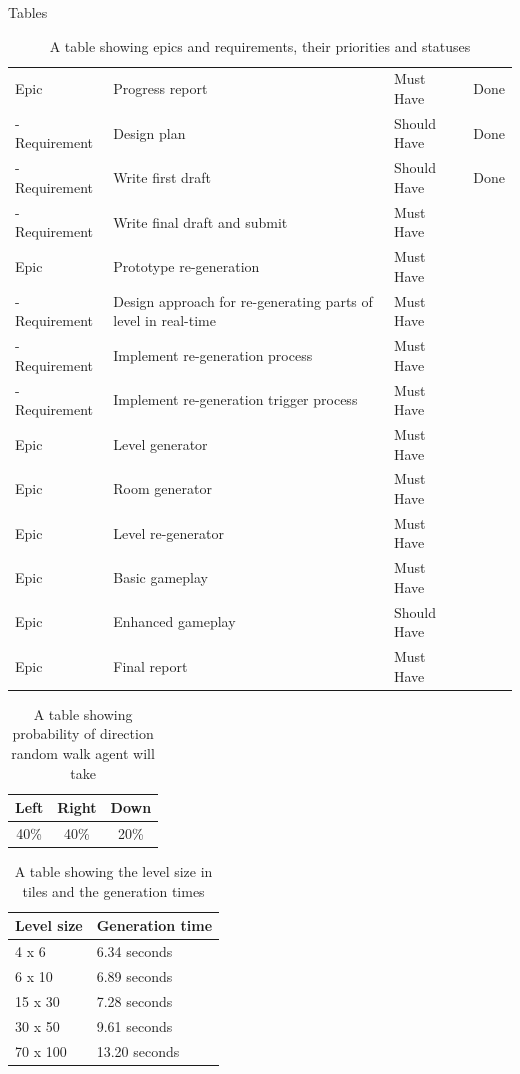 \documentclass[progress]{cmpreport}
\begin{document}
\begin{section}{Tables}
\begin{table}[]
{\begin{tabular}{llll}
    Epic & Progress report & Must Have & Done \\
    - Requirement & Design plan & Should Have & Done \\
    - Requirement & Write first draft & Should Have & Done \\
    - Requirement & Write final draft and submit & Must Have &  \\ \hline
    Epic & Prototype re-generation & Must Have &  \\
    - Requirement & Design approach for re-generating parts of level in real-time & Must Have &  \\
    - Requirement & Implement re-generation process & Must Have &  \\
    - Requirement & Implement re-generation trigger process & Must Have &  \\ \hline
    Epic & Level generator & Must Have &  \\ \hline
    Epic & Room generator & Must Have &  \\ \hline
    Epic & Level re-generator & Must Have &  \\ \hline
    Epic & Basic gameplay & Must Have &  \\ \hline
    Epic & Enhanced gameplay & Should Have &  \\ \hline
    Epic & Final report & Must Have &  \\ \hline
    \end{tabular}%
    }
    \caption{A table showing epics and requirements, their priorities and statuses}
    \label{tab:epicreqs}
\end{table}

\begin{table}[h!]
    \centering
    \begin{tabular}{ |c|c|c| }
    \hline
    \textbf{Left} & \textbf{Right} & \textbf{Down} \\ 
    \hline
    40\% & 40\% & 20\%\\ 
    \hline
    \end{tabular}
    \caption{A table showing probability of direction random walk agent will take}
    \label{tab:probdirs}
\end{table}

\begin{table}[]
    \centering
    \begin{tabular}{|l|l|}
    \hline
    \textbf{Level size} & \textbf{Generation time} \\ \hline
    4 x 6 & 6.34 seconds \\ \hline
    6 x 10 & 6.89 seconds \\ \hline
    15 x 30 & 7.28 seconds \\ \hline
    30 x 50 & 9.61 seconds \\ \hline
    70 x 100 & 13.20 seconds \\ \hline
    \end{tabular}
    \caption{A table showing the level size in tiles and the generation times}
    \label{tab:gentimes}
    \end{table}

\end{section}
\end{document}
